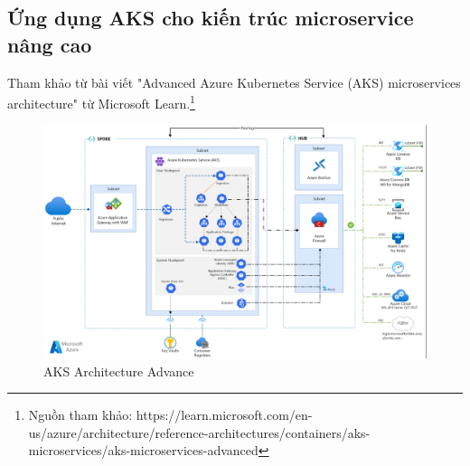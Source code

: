 \subsection {Ứng dụng AKS cho kiến trúc microservice nâng cao}
\noindent Tham khảo từ bài viết "Advanced Azure Kubernetes Service (AKS) microservices architecture" từ Microsoft Learn.\footnote{Nguồn tham khảo: https://learn.microsoft.com/en-us/azure/architecture/reference-architectures/containers/aks-microservices/aks-microservices-advanced}
\begin{figure}[H]
    \centering
    \includegraphics[scale=0.6]{images/hieu/chap-2/aks-architecture-advance.png}
    \caption{AKS Architecture Advance}
\end{figure}
